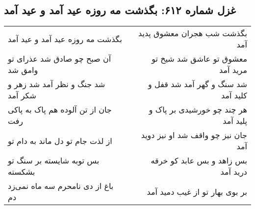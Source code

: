 \begin{center}
\section*{غزل شماره ۶۱۲: بگذشت مه روزه عید آمد و عید آمد}
\label{sec:0612}
\begin{longtable}{l p{0.5cm} r}
بگذشت مه روزه عید آمد و عید آمد
&&
بگذشت شب هجران معشوق پدید آمد
\\
آن صبح چو صادق شد عذرای تو وامق شد
&&
معشوق تو عاشق شد شیخ تو مرید آمد
\\
شد جنگ و نظر آمد شد زهر و شکر آمد
&&
شد سنگ و گهر آمد شد قفل و کلید آمد
\\
جان از تن آلوده هم پاک به پاکی رفت
&&
هر چند چو خورشیدی بر پاک و پلید آمد
\\
از لذت جام تو دل ماند به دام تو
&&
جان نیز چو واقف شد او نیز دوید آمد
\\
بس توبه شایسته بر سنگ تو بشکسته
&&
بس زاهد و بس عابد کو خرقه درید آمد
\\
باغ از دی نامحرم سه ماه نمی‌زد دم
&&
بر بوی بهار تو از غیب دمید آمد
\\
\end{longtable}
\end{center}
